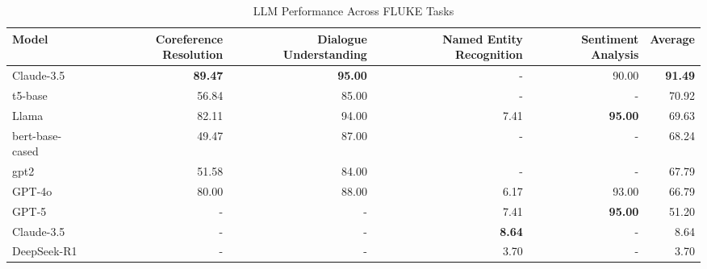 \begin{table}[htbp]
\centering
\caption{LLM Performance Across FLUKE Tasks}
\label{tab:cross_task_comparison}
\begin{tabular}{lrrrrr}
\toprule
Model & Coreference Resolution & Dialogue Understanding & Named Entity Recognition & Sentiment Analysis & Average \\
\midrule
Claude-3.5 & \textbf{89.47} & \textbf{95.00} & - & 90.00 & \textbf{91.49} \\
t5-base & 56.84 & 85.00 & - & - & 70.92 \\
Llama & 82.11 & 94.00 & 7.41 & \textbf{95.00} & 69.63 \\
bert-base-cased & 49.47 & 87.00 & - & - & 68.24 \\
gpt2 & 51.58 & 84.00 & - & - & 67.79 \\
GPT-4o & 80.00 & 88.00 & 6.17 & 93.00 & 66.79 \\
GPT-5 & - & - & 7.41 & \textbf{95.00} & 51.20 \\
Claude-3.5 & - & - & \textbf{8.64} & - & 8.64 \\
DeepSeek-R1 & - & - & 3.70 & - & 3.70 \\
\bottomrule
\end{tabular}
\end{table}
